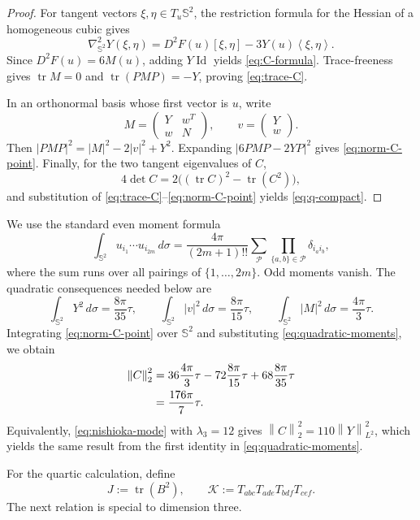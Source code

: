 \documentclass[11pt,reqno]{amsart}
\theoremstyle{remark}
\newcommand{\Sph}{\mathbb S^2}
\newcommand{\Id}{\operatorname{Id}}
\newcommand{\tr}{\operatorname{tr}}
\newcommand{\dd}{\,d\sigma}
\newcommand{\ip}[2]{\left\langle #1,#2\right\rangle}
\newcommand{\norm}[1]{\left\lVert #1\right\rVert}
\newcommand{\abs}[1]{\left\lvert #1\right\rvert}
\begin{document}
\begin{proof}
For tangent vectors $\xi,\eta\in T_u\Sph$, the restriction formula for the
Hessian of a homogeneous cubic gives
\[
 \nabla^2_{\Sph}Y(\xi,\eta)
 =D^2F(u)[\xi,\eta]-3Y(u)\ip{\xi}{\eta}.
\]
Since $D^2F(u)=6M(u)$, adding $Y\Id$ yields
\eqref{eq:C-formula}. Trace-freeness gives $\tr M=0$ and
$\tr(PMP)=-Y$, proving \eqref{eq:trace-C}.

In an orthonormal basis whose first vector is $u$, write
\[
 M=\begin{pmatrix}Y&w^T\\ w&N\end{pmatrix},
 \qquad
 v=\begin{pmatrix}Y\\w\end{pmatrix}.
\]
Then $\abs{PMP}^2=\abs{M}^2-2\abs{v}^2+Y^2$. Expanding
$\abs{6PMP-2YP}^2$ gives \eqref{eq:norm-C-point}. Finally, for the two tangent
eigenvalues of $C$,
\[
 4\det C=2\bigl((\tr C)^2-\tr(C^2)\bigr),
\]
and substitution of \eqref{eq:trace-C}--\eqref{eq:norm-C-point} yields
\eqref{eq:q-compact}.
\end{proof}

We use the standard even moment formula
\begin{equation}\label{eq:sphere-moment}
 \int_{\Sph}u_{i_1}\cdots u_{i_{2m}}\dd
 =\frac{4\pi}{(2m+1)!!}
   \sum_{\mathcal P}\prod_{\{a,b\}\in\mathcal P}\delta_{i_ai_b},
\end{equation}
where the sum runs over all pairings of $\{1,\ldots,2m\}$. Odd moments vanish.
The quadratic consequences needed below are
\begin{equation}\label{eq:quadratic-moments}
 \int_{\Sph}Y^2\dd=\frac{8\pi}{35}\tau,
 \qquad
 \int_{\Sph}\abs{v}^2\dd=\frac{8\pi}{15}\tau,
 \qquad
 \int_{\Sph}\abs{M}^2\dd=\frac{4\pi}{3}\tau.
\end{equation}
Integrating \eqref{eq:norm-C-point} over $\Sph$ and substituting
\eqref{eq:quadratic-moments}, we obtain
\begin{align}
 \norm{C}_2^2
 &=36\frac{4\pi}{3}\tau
   -72\frac{8\pi}{15}\tau
   +68\frac{8\pi}{35}\tau \notag\\
 &=\frac{176\pi}{7}\tau.
 \label{eq:C-norm-invariant}
\end{align}
Equivalently, \eqref{eq:nishioka-mode} with $\lambda_3=12$ gives
$\norm{C}_2^2=110\norm{Y}_{L^2}^2$, which yields the same result from the
first identity in \eqref{eq:quadratic-moments}.

For the quartic calculation, define
\[
 J:=\tr(B^2),
 \qquad
 \mathcal K:=T_{abc}T_{ade}T_{bdf}T_{cef}.
\]
The next relation is special to dimension three.
\end{document}
